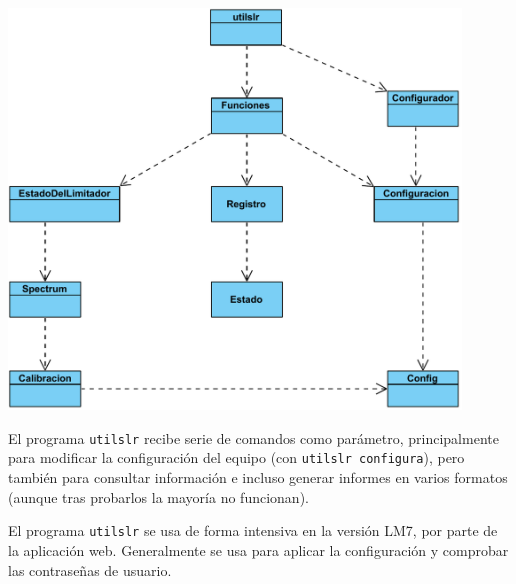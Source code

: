 
\begin{center}
    \includegraphics[width=0.9\textwidth]{figuras/lms9-utilslr.pdf}
    \label{fig:utilslr}
\end{center}

El programa \verb|utilslr| recibe serie de comandos como parámetro, principalmente para modificar la configuración del equipo (con \verb|utilslr configura|), pero también para consultar información e incluso generar informes en varios formatos (aunque tras probarlos la mayoría no funcionan).

El programa \verb|utilslr| se usa de forma intensiva en la versión LM7, por parte de la aplicación web. Generalmente se usa para aplicar la configuración y comprobar las contraseñas de usuario.

